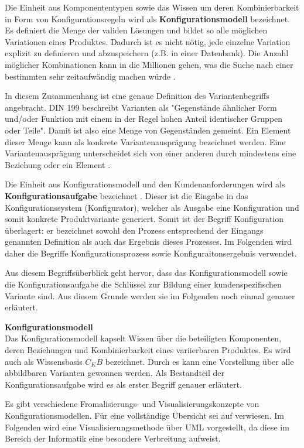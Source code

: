 \documentclass[12pt,a4paper,bibliography=totocnumbered,listof=totoc]{scrartcl}
\begin{document}
Die Einheit aus Komponententypen sowie das Wissen um deren Kombinierbarkeit in Form von Konfigurationsregeln wird als \textbf{Konfigurationsmodell} bezeichnet. Es definiert die Menge der validen Lösungen und bildet so alle möglichen Variationen eines Produktes. Dadurch ist es nicht nötig, jede einzelne Variation explizit zu definieren und abzuspeichern (z.B. in einer Datenbank). Die Anzahl möglicher Kombinationen kann in die Millionen gehen, was die Suche nach einer bestimmten sehr zeitaufwändig machen würde \citep{falkner11}.

In diesem Zusammenhang ist eine genaue Definition des Variantenbegriffs angebracht. DIN 199 beschreibt Varianten als "Gegenstände ähnlicher Form und/oder Funktion mit einem in der Regel hohen Anteil identischer Gruppen oder Teile". Damit ist also eine Menge von Gegenständen gemeint. Ein Element dieser Menge kann als konkrete Variantenausprägung bezeichnet werden. Eine Variantenausprägung unterscheidet sich von einer anderen durch mindestens eine Beziehung oder ein Element \citep{lutz11}.

Die Einheit aus Konfigurationsmodell und den Kundenanforderungen wird als \textbf{Konfigurationsaufgabe} bezeichnet \citep{felferning14}. Dieser ist die Eingabe in das Konfigurationssystem (Konfigurator), welcher als Ausgabe eine Konfiguration und somit konkrete Produktvariante generiert. Somit ist der Begriff Konfiguration überlagert: er bezeichnet sowohl den Prozess entsprechend der Eingangs genannten Definition als auch das Ergebnis dieses Prozesses. Im Folgenden wird daher die Begriffe Konfigurationsprozess sowie Konfiguraitonsergebnis verwendet.

Aus diesem Begriffsüberblick geht hervor, dass das Konfigurationsmodell sowie die Konfigurationsaufgabe die Schlüssel zur Bildung einer kundenspezifischen Variante sind. Aus diesem Grunde werden sie im Folgenden noch einmal genauer erläutert.


\textbf{Konfigurationsmodell}\\
Das Konfigurationsmodell kapselt Wissen über die beteiligten Komponenten, deren Beziehungen und Kombinierbarkeit eines variierbaren Produktes. Es wird auch als Wissensbasis $C_KB$ bezeichnet. Durch es kann eine Vorstellung über alle abbildbaren Varianten gewonnen werden. Als Bestandteil der Konfigurationsaufgabe wird es als erster Begriff genauer erläutert.

Es gibt verschiedene Fromalisierungs- und Visualisierungskonzepte von Konfigurationsmodellen. Für eine vollständige Übersicht sei auf \citet{felferning14} verwiesen. Im Folgenden wird eine Visualisierungsmethode über UML vorgestellt, da diese im Bereich der Informatik eine besondere Verbreitung aufweist.
\end{document}
